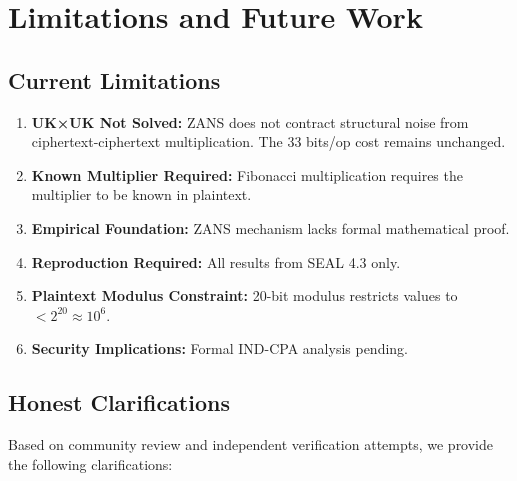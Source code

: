 
\section{Limitations and Future Work}

\subsection{Current Limitations}

\begin{enumerate}
    \item \textbf{UK×UK Not Solved:} ZANS does not contract structural noise from ciphertext-ciphertext multiplication. The 33 bits/op cost remains unchanged.
    
    \item \textbf{Known Multiplier Required:} Fibonacci multiplication requires the multiplier to be known in plaintext.
    
    \item \textbf{Empirical Foundation:} ZANS mechanism lacks formal mathematical proof.
    
    \item \textbf{Reproduction Required:} All results from SEAL 4.3 only.
    
    \item \textbf{Plaintext Modulus Constraint:} 20-bit modulus restricts values to $< 2^{20} \approx 10^6$.
    
    \item \textbf{Security Implications:} Formal IND-CPA analysis pending.
\end{enumerate}

\subsection{Honest Clarifications}

Based on community review and independent verification attempts, we provide the following clarifications:

